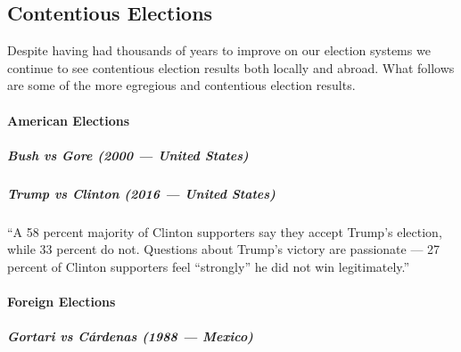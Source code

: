 \subsection{Contentious Elections}
Despite having had thousands of years to improve on our election systems we
continue to see contentious election results both locally and abroad. What
follows are some of the more egregious and contentious election results.

\paragraph{American Elections}
\subparagraph{Bush vs Gore (2000 --- United States)}


\subparagraph{Trump vs Clinton (2016 --- United States)}
\begin{displayquote}
  ``A 58 percent majority of Clinton supporters say they accept Trump's
  election, while 33 percent do not. Questions about Trump's victory are
  passionate --- 27 percent of Clinton supporters feel ``strongly'' he did not
  win legitimately.''
\end{displayquote}

\paragraph{Foreign Elections}
\subparagraph{Gortari vs Cárdenas (1988 --- Mexico)}
